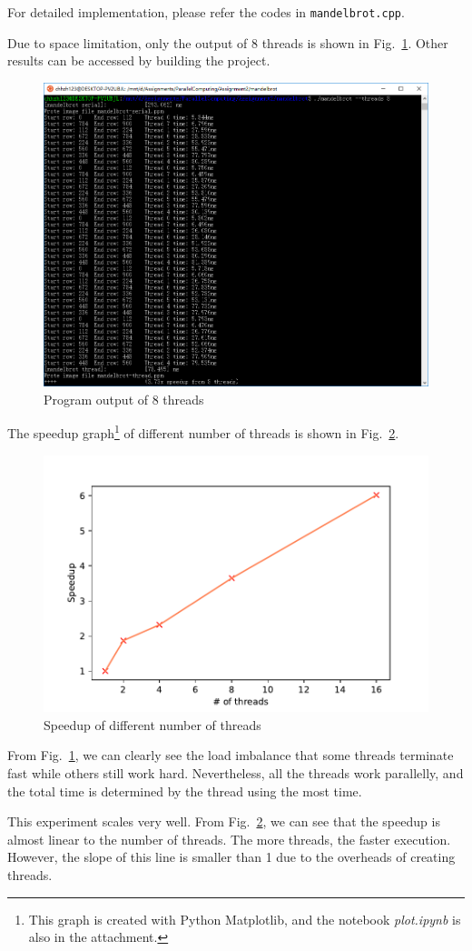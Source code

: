 \documentclass[english]{thesis}
\begin{document}
For detailed implementation, please refer the codes in \verb'mandelbrot.cpp'.

Due to space limitation, only the output of 8 threads is shown in Fig.~\ref{fig:result}.
Other results can be accessed by building the project.
\begin{figure}[H]
\centering
\includegraphics[width=0.7\linewidth]{fig/result.PNG}
\caption{Program output of 8 threads}
\label{fig:result}
\end{figure}

The speedup graph\footnote{This graph is created with Python Matplotlib, and the notebook \textit{plot.ipynb} is also in the attachment.} of different number of threads is shown in Fig.~\ref{fig:speedup}.
\begin{figure}[H]
\centering
\includegraphics[width=0.5\linewidth]{fig/speedup.pdf}
\caption{Speedup of different number of threads}
\label{fig:speedup}
\end{figure}

From Fig.~\ref{fig:result}, we can clearly see the load imbalance that some threads terminate fast while others still work hard.
Nevertheless, all the threads work parallelly, and the total time is determined by the thread using the most time.

This experiment scales very well.
From Fig.~\ref{fig:speedup}, we can see that the speedup is almost linear to the number of threads.
The more threads, the faster execution.
However, the slope of this line is smaller than 1 due to the overheads of creating threads.
\end{document}
